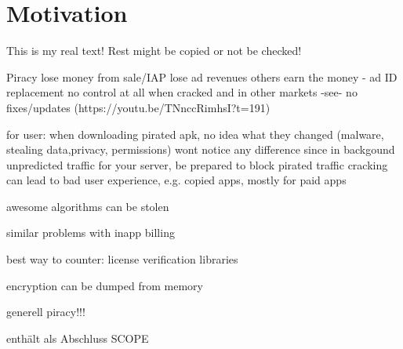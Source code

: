 \section{Motivation}\label{section:introduction-motivation}
This is my real text! Rest might be copied or not be checked!


Piracy\newline
lose money from sale/IAP\newline
lose ad revenues\newline
others earn the money  - ad ID replacement\newline
no control at all when cracked and in other markets -see- no fixes/updates (https://youtu.be/TNnccRimhsI?t=191)\newline

for user: when downloading pirated apk, no idea what they changed (malware, stealing data,privacy, permissions)\newline
wont notice any difference since in backgound\newline
unpredicted traffic for your server, be prepared to block pirated traffic\newline
cracking can lead to bad user experience, e.g. copied apps, mostly for paid apps\newline

awesome algorithms can be stolen\newline

similar problems with inapp billing\newline

best way to counter: license verification libraries\newline

encryption can be dumped from memory\newline

generell piracy!!!\newline

enthält als Abschluss SCOPE\newline
